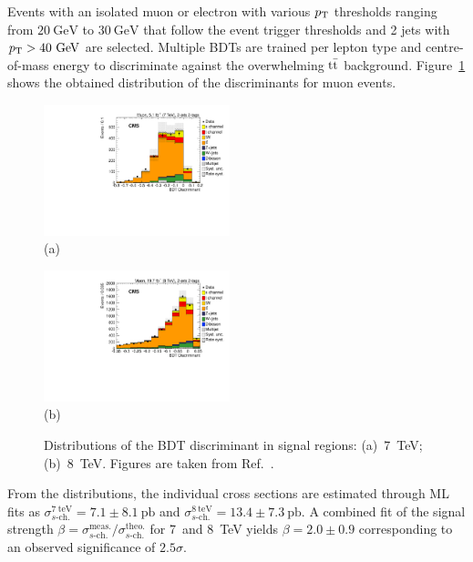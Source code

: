\documentclass{PoS}
\begin{document}
Events with an isolated muon or electron with various $p_\mathrm{T}$ thresholds ranging from $20~\mathrm{GeV}$ to $30~\mathrm{GeV}$ that follow the event trigger thresholds and 2 jets with $p_\mathrm{T}>40~\mathrm{GeV}$ are selected. Multiple BDTs are trained per lepton type and centre-of-mass energy to discriminate against the overwhelming $\mathrm{t}\bar{\mathrm{t}}$ background. Figure~\ref{fig:schannel-BDT} shows the obtained distribution of the discriminants for muon events.

\begin{figure}[htbp]
\begin{center}
\parbox[t]{0.49\textwidth}{\centering\includegraphics[width=0.48\textwidth]{figures/schannel/mu_7TeV_BDT_signal.pdf}\\(a)}
\parbox[t]{0.49\textwidth}{\centering\includegraphics[width=0.48\textwidth]{figures/schannel/mu_8TeV_BDT_signal.pdf}\\(b)}
\caption{\label{fig:schannel-BDT}Distributions of the BDT discriminant in signal regions: (a)~7~TeV; (b)~8~TeV. Figures are taken from Ref.~\cite{CMS-PAS-TOP-13-009}.}
\end{center}
\end{figure}

From the distributions, the individual cross sections are estimated through ML fits as $\sigma^\mathrm{7~teV}_{s\mbox{-}\mathrm{ch.}}=7.1\pm8.1~\mathrm{pb}$ and $\sigma^\mathrm{8~teV}_{s\mbox{-}\mathrm{ch.}}=13.4\pm7.3~\mathrm{pb}$. A combined fit of the signal strength $\beta=\sigma^\mathrm{meas.}_{s\mbox{-}\mathrm{ch.}}/\sigma^\mathrm{theo.}_{s\mbox{-}\mathrm{ch.}}$ for 7~and 8~TeV yields $\beta=2.0\pm0.9$ corresponding to an observed significance of $2.5\sigma$.
\end{document}
